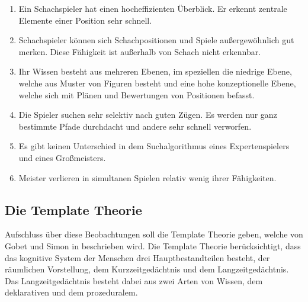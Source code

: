 \begin{enumerate}
    \item Ein Schachspieler hat einen hocheffizienten Überblick. Er erkennt zentrale Elemente einer Position sehr schnell.
    \item Schachspieler können sich Schachpositionen und Spiele außergewöhnlich gut merken. Diese Fähigkeit ist außerhalb von Schach nicht erkennbar.
    \item Ihr Wissen besteht aus mehreren Ebenen, im speziellen die niedrige Ebene, welche aus Muster von Figuren besteht und eine hohe konzeptionelle Ebene, welche sich mit Plänen und Bewertungen von Positionen befasst.
    \item Die Spieler suchen sehr selektiv nach guten Zügen. Es werden nur ganz bestimmte Pfade durchdacht und andere sehr schnell verworfen.
    \item Es gibt keinen Unterschied in dem Suchalgorithmus eines Expertenspielers und eines Großmeisters.
    \item Meister verlieren in simultanen Spielen relativ wenig ihrer Fähigkeiten.
\end{enumerate}

\subsection{Die Template Theorie}
Aufschluss über diese Beobachtungen soll die Template Theorie geben, welche von Gobet und Simon in \cite{gobet_templates_1996} beschrieben wird. Die Template Theorie berücksichtigt, dass das kognitive System der Menschen drei Hauptbestandteilen besteht, der räumlichen Vorstellung, dem Kurzzeitgedächtnis und dem Langzeitgedächtnis.
Das Langzeitgedächtnis besteht dabei aus zwei Arten von Wissen, dem deklarativen und dem prozeduralem.
\cite{gobet_training_2006}

